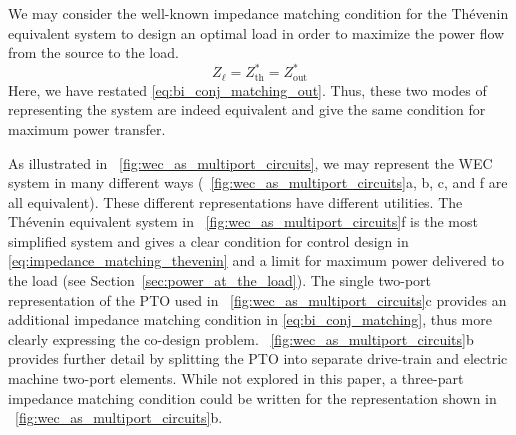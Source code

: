 \documentclass[twocolumn]{autart}
\begin{document}
We may consider the well-known impedance matching condition for the Th\'{e}venin equivalent system to design an optimal load in order to maximize the power flow from the source to the load.
%
\begin{equation}
        Z_\ell = Z_{\textrm{th}}^* = Z_{\textrm{out}}^*
        \label{eq:impedance_matching_thevenin}
\end{equation}
%
Here, we have restated \eqref{eq:bi_conj_matching_out}.
Thus, these two modes of representing the system are indeed equivalent and give the same condition for maximum power transfer.

As illustrated in \figurename~\ref{fig:wec_as_multiport_circuits}, we may represent the WEC system in many different ways (\figurename~\ref{fig:wec_as_multiport_circuits}a, b, c, and f are all equivalent).
These different representations have different utilities.
The Th\'{e}venin equivalent system in \figurename~\ref{fig:wec_as_multiport_circuits}f is the most simplified system and gives a clear condition for control design in \eqref{eq:impedance_matching_thevenin} and a limit for maximum power delivered to the load (see Section~\ref{sec:power_at_the_load}).
The single two-port representation of the PTO used in \figurename~\ref{fig:wec_as_multiport_circuits}c provides an additional impedance matching condition in \eqref{eq:bi_conj_matching}, thus more clearly expressing the co-design problem.
\figurename~\ref{fig:wec_as_multiport_circuits}b provides further detail by splitting the PTO into separate drive-train and electric machine two-port elements.
While not explored in this paper, a three-part impedance matching condition could be written for the representation shown in \figurename~\ref{fig:wec_as_multiport_circuits}b.

\end{document}

